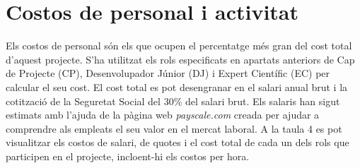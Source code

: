 \section{Costos de personal i activitat}
Els costos de personal són els que ocupen el percentatge més gran del cost total d'aquest projecte. S'ha utilitzat els rols especificats en apartats anteriors de Cap de Projecte (CP), Desenvolupador Júnior (DJ) i Expert Científic (EC) per calcular el seu cost. El cost total es pot desengranar en el salari anual brut i la cotització de la Seguretat Social del 30\% del salari brut. Els salaris han sigut estimats amb l'ajuda de la pàgina web \textit{payscale.com} creada per ajudar a comprendre als empleats el seu valor en el mercat laboral. A la taula 4 es pot visualitzar els costos de salari, de quotes i el cost total de cada un dels rols que participen en el projecte, incloent-hi els costos per hora.


